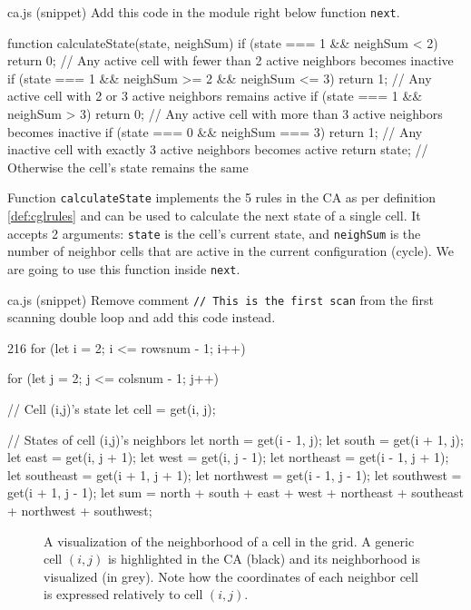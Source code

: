 \begin{programcode}{ca.js (snippet)}
Add this code in the module right below function \texttt{next}.
\begin{code}
function calculateState(state, neighSum) {
  if (state === 1 && neighSum < 2) {
    return 0; // Any active cell with fewer than 2 active neighbors becomes inactive
  }
  if (state === 1 && neighSum >= 2 && neighSum <= 3) {
    return 1; // Any active cell with 2 or 3 active neighbors remains active
  }
  if (state === 1 && neighSum > 3) {
    return 0; // Any active cell with more than 3 active neighbors becomes inactive
  }
  if (state === 0 && neighSum === 3) {
    return 1; // Any inactive cell with exactly 3 active neighbors becomes active
  }
  return state; // Otherwise the cell's state remains the same
}
\end{code}
\end{programcode}

Function \texttt{calculateState} implements the 5 rules in the CA as per definition \ref{def:cglrules} and
can be used to calculate the next state of a single cell.
It accepts 2 arguments: \texttt{state} is the cell's current state, and \texttt{neighSum} is the number of
neighbor cells that are active in the current configuration (cycle).
We are going to use this function inside \texttt{next}.

\begin{programcode}{ca.js (snippet)}
Remove comment \texttt{// This is the first scan} from the first scanning double loop and add this
code instead.
\begin{codeh1}{2}{16}
for (let i = 2; i <= rowsnum - 1; i++) {
  for (let j = 2; j <= colsnum - 1; j++) {
    // Cell (i,j)'s state
    let cell = get(i, j);

    // States of cell (i,j)'s neighbors
    let north = get(i - 1, j);
    let south = get(i + 1, j);
    let east = get(i, j + 1);
    let west = get(i, j - 1);
    let northeast = get(i - 1, j + 1);
    let southeast = get(i + 1, j + 1);
    let northwest = get(i - 1, j - 1);
    let southwest = get(i + 1, j - 1);
    let sum = north + south + east + west + northeast + southeast + northwest + southwest;
  }
}
\end{codeh1}
\end{programcode}

%
\begin{figure}[b]
\sidecaption

%
%
\caption{A visualization of the neighborhood of a cell in the grid.
A generic cell $(i,j)$ is highlighted in the CA (black)
and its neighborhood is visualized (in grey).
Note how the coordinates of each neighbor cell is expressed relatively
to cell $(i,j)$.}
\label{fig:cellneigh}
\end{figure}
%

